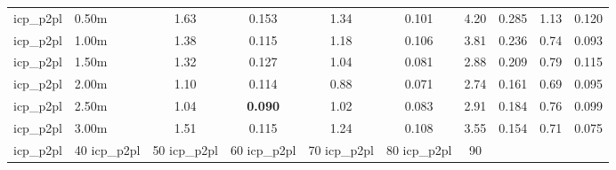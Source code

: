 \begin{tabular}{llcccccccc}
\midrule
icp\_p2pl & 0.50m & 1.63 & 0.153 & 1.34 & 0.101 & 4.20 & 0.285 & 1.13 & 0.120 \\
icp\_p2pl & 1.00m & 1.38 & 0.115 & 1.18 & 0.106 & 3.81 & 0.236 & 0.74 & 0.093 \\
icp\_p2pl & 1.50m & 1.32 & 0.127 & 1.04 & 0.081 & 2.88 & 0.209 & 0.79 & 0.115 \\
icp\_p2pl & 2.00m & 1.10 & 0.114 & 0.88 & 0.071 & 2.74 & 0.161 & 0.69 & 0.095 \\
icp\_p2pl & 2.50m & 1.04 & \bfseries 0.090 & 1.02 & 0.083 & 2.91 & 0.184 & 0.76 & 0.099 \\
icp\_p2pl & 3.00m & 1.51 & 0.115 & 1.24 & 0.108 & 3.55 & 0.154 & 0.71 & 0.075 \\
icp\_p2pl & 40%
icp\_p2pl & 50%
icp\_p2pl & 60%
icp\_p2pl & 70%
icp\_p2pl & 80%
icp\_p2pl & 90%
\bottomrule
\end{tabular}
